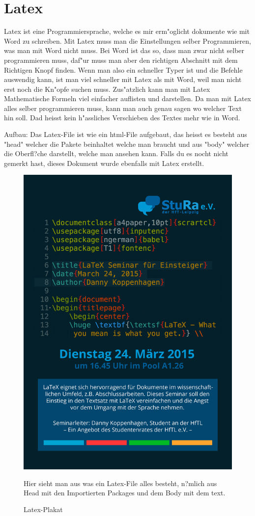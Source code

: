\documentclass{article}
\begin{document}
\section{Latex}
Latex ist eine Programmiersprache, welche es mir erm"oglicht dokumente wie mit Word zu schreiben.
Mit Latex muss man die Einstellungen selber Programmieren, was man mit Word nicht muss.
Bei Word ist das so, dass man zwar nicht selber programmieren muss, daf"ur muss man aber den richtigen Abschnitt mit dem Richtigen Knopf finden.
Wenn man also ein schneller Typer ist und die Befehle auswendig kann, ist man viel schneller mit Latex als mit Word, weil man nicht erst noch die Kn"opfe suchen muss.
Zus"atzlich kann man mit Latex Mathematische Formeln viel einfacher auflisten und darstellen.
Da man mit Latex alles selber programmieren muss, kann man auch genau sagen wo welcher Text hin soll.
Dad heisst kein h"assliches Verschieben des Textes mehr wie in Word.

Aufbau: Das Latex-File ist wie ein html-File aufgebaut, das heisst es besteht aus "head" welcher die Pakete beinhaltet welche man braucht und aus "body"
welcher die Oberfl?che darstellt, welche man ansehen kann.
Falls du es nocht nicht gemerkt hast, dieses Dokument wurde ebenfalls mit Latex erstellt.


\begin{figure}[ht]
    \centering
    \includegraphics[width=.6\linewidth]{latex-plakat}
    \caption{Latex-Plakat}
    \label{fig:sub1}{Hier sieht man aus was ein Latex-File alles besteht, n?mlich aus Head mit den Importierten Packages und
    dem Body mit dem text.}
    \end{figure}
\end{document}
